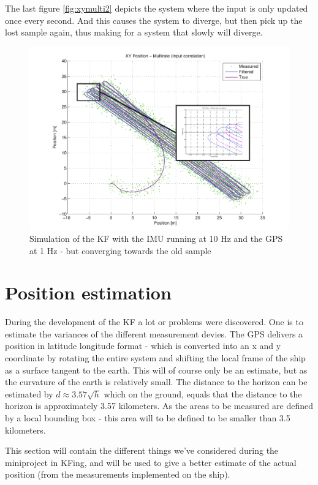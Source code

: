 The last figure \vref{fig:xymulti2} depicts the system where the input is only updated once every second. And this causes the system to diverge, but then pick up the lost sample again, thus making for a system that slowly will diverge.

\begin{figure}[htbp]
	\centering
	\includegraphics[width=\textwidth]{img/xymnirate}
	\caption{Simulation of the \ac{KF} with the \ac{IMU} running at 10 Hz and the \ac{GPS} at 1 Hz - but converging towards the old sample}
	\label{fig:xymulti2}
\end{figure}

\section{Position estimation}
During the development of the \ac{KF} a lot or problems were discovered. One is to estimate the variances of the different measurement devies. The GPS delivers a position in latitude longitude format - which is converted into an x and y coordinate by rotating the entire system and shifting the local frame of the ship as a surface tangent to the earth. This will of course only be an estimate, but as the curvature of the earth is relatively small. The distance to the horizon can be estimated by $d \approx 3.57\sqrt{h}$ which on the ground, equals that the distance to the horizon is approximately 3.57 kilometers. As the areas to be measured are defined by a local bounding box - this area will to be defined to be smaller than 3.5 kilometers.

This section will contain the different things we've considered during the miniproject in \ac{KF}ing, and will be used to give a better estimate of the actual position (from the measurements implemented on the ship).

